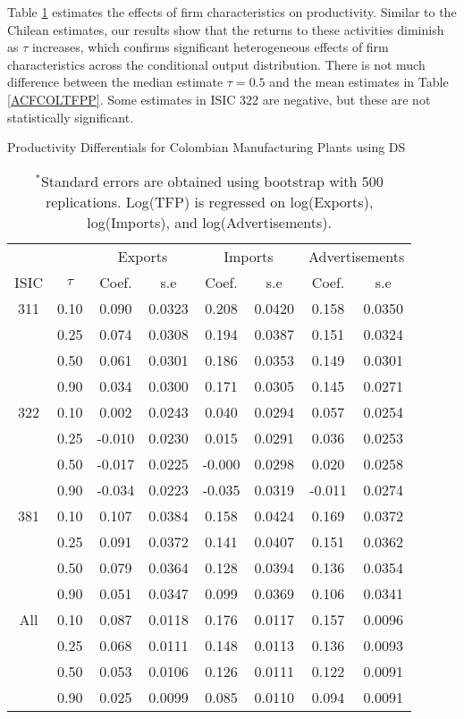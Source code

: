 \documentclass[12pt]{article}
\begin{document}
Table \ref{QACFCOLTFPP} estimates the effects of firm characteristics on productivity. Similar to the Chilean estimates, our results show that the returns to these activities diminish as $\tau$ increases, which confirms significant heterogeneous effects of firm characteristics across the conditional output distribution. There is not much difference between the median estimate $\tau=0.5$ and the mean estimates in Table \ref{ACFCOLTFPP}. Some estimates in ISIC 322 are negative, but these are not statistically significant.

\begin{table}[H]
\centering
\caption{Productivity Differentials for Colombian Manufacturing Plants using DS}
\small
\begin{tabular}{cccccccc}
  \hline\hline & & \multicolumn{2}{c}{Exports}  & \multicolumn{2}{c}{Imports} & \multicolumn{2}{c}{Advertisements} \\ \cmidrule(lr){3-4} \cmidrule(lr){5-6} \cmidrule(lr){7-8}ISIC & $\tau$ & Coef. & s.e & Coef. & s.e & Coef. & s.e \\ 
  \hline
311 & 0.10 & 0.090 & 0.0323 & 0.208 & 0.0420 & 0.158 & 0.0350 \\ 
   & 0.25 & 0.074 & 0.0308 & 0.194 & 0.0387 & 0.151 & 0.0324 \\ 
   & 0.50 & 0.061 & 0.0301 & 0.186 & 0.0353 & 0.149 & 0.0301 \\ 
   & 0.90 & 0.034 & 0.0300 & 0.171 & 0.0305 & 0.145 & 0.0271 \\ 
  322 & 0.10 & 0.002 & 0.0243 & 0.040 & 0.0294 & 0.057 & 0.0254 \\ 
   & 0.25 & -0.010 & 0.0230 & 0.015 & 0.0291 & 0.036 & 0.0253 \\ 
   & 0.50 & -0.017 & 0.0225 & -0.000 & 0.0298 & 0.020 & 0.0258 \\ 
   & 0.90 & -0.034 & 0.0223 & -0.035 & 0.0319 & -0.011 & 0.0274 \\ 
  381 & 0.10 & 0.107 & 0.0384 & 0.158 & 0.0424 & 0.169 & 0.0372 \\ 
   & 0.25 & 0.091 & 0.0372 & 0.141 & 0.0407 & 0.151 & 0.0362 \\ 
   & 0.50 & 0.079 & 0.0364 & 0.128 & 0.0394 & 0.136 & 0.0354 \\ 
   & 0.90 & 0.051 & 0.0347 & 0.099 & 0.0369 & 0.106 & 0.0341 \\ 
  All & 0.10 & 0.087 & 0.0118 & 0.176 & 0.0117 & 0.157 & 0.0096 \\ 
   & 0.25 & 0.068 & 0.0111 & 0.148 & 0.0113 & 0.136 & 0.0093 \\ 
   & 0.50 & 0.053 & 0.0106 & 0.126 & 0.0111 & 0.122 & 0.0091 \\ 
   & 0.90 & 0.025 & 0.0099 & 0.085 & 0.0110 & 0.094 & 0.0091 \\ 
   \hline
\end{tabular}
\caption*{\footnotesize $^{*}$Standard errors are obtained using bootstrap with 500 replications. Log(TFP) is regressed on log(Exports), log(Imports), and log(Advertisements).}
\label{QACFCOLTFPP}
\end{table}
\end{document}
